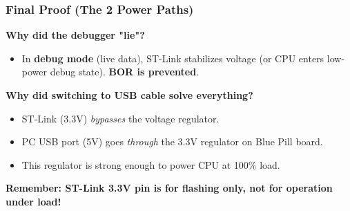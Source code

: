 \documentclass{beamer}
\begin{document}
\begin{frame}
	\frametitle{Final Proof (The 2 Power Paths)}
	\textbf{Why did the debugger "lie"?}
	\begin{itemize}
		\item In \textbf{debug mode} (live data), ST-Link stabilizes
		voltage (or CPU enters low-power debug state).
		\textbf{BOR is prevented}.
	\end{itemize}
	\bigskip
	\textbf{Why did switching to USB cable solve everything?}
	\begin{itemize}
		\item ST-Link (3.3V) \textit{bypasses} the voltage regulator.
		\item PC USB port (5V) goes \textit{through} the 3.3V regulator
		on Blue Pill board.
		\item This regulator is strong enough to power CPU at 100\% load.
	\end{itemize}
	\medskip
	\textbf{Remember: ST-Link 3.3V pin is for flashing only,
		not for operation under load!}
\end{frame}
\end{document}

